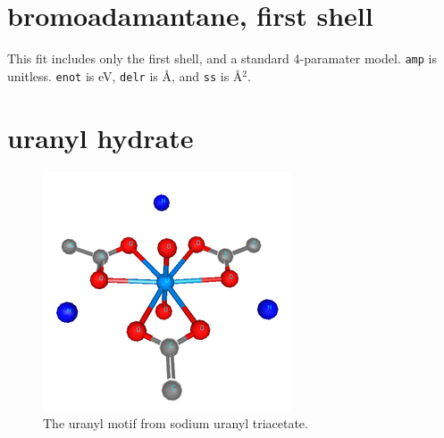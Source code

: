 \documentclass{article}
\let\stdsection\section
\renewcommand\section{\newpage\stdsection}
\begin{document}
\renewcommand{\feffMaterial}{bromoadamantane}
\renewcommand{\feffRone}{8}
\renewcommand{\feffFirst}{}

\small

\scfthreeplots


\section{bromoadamantane, first shell}
\normalsize

This fit includes only the first shell, and a standard 4-paramater
model.  \texttt{amp} is unitless.  \texttt{enot} is eV, \texttt{delr}
is \AA, and \texttt{ss} is \AA$^2$.

\renewcommand{\feffFirst}{_1st}

\small

\scfthreeplots







\section{uranyl hydrate}
\normalsize

\begin{figure}
  \includegraphics[width=\linewidth]{uranyl/uranyl.png}
  \caption{The uranyl motif from sodium uranyl triacetate.}
\end{figure}
\end{document}
